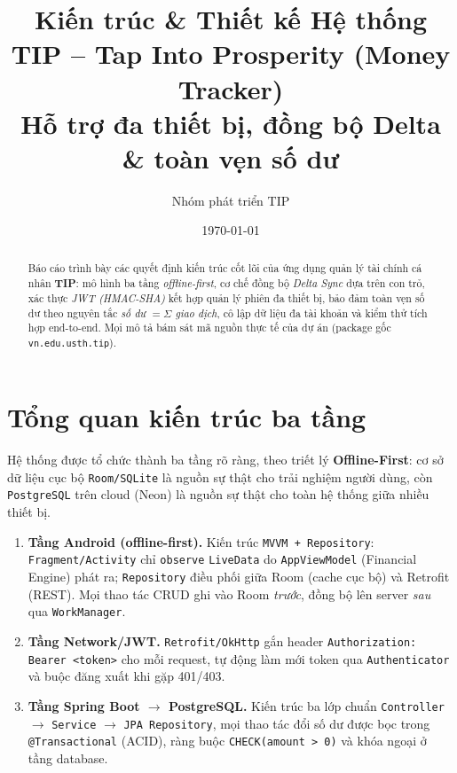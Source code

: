 \documentclass[11pt,a4paper]{article}
\title{\textbf{Kiến trúc \& Thiết kế Hệ thống}\\[4pt]
       \large TIP -- Tap Into Prosperity (Money Tracker)\\
       \normalsize Hỗ trợ đa thiết bị, đồng bộ Delta \& toàn vẹn số dư}
\author{Nhóm phát triển TIP}
\date{\today}
\begin{document}
\maketitle
\begin{abstract}
\noindent Báo cáo trình bày các quyết định kiến trúc cốt lõi của ứng dụng quản lý
tài chính cá nhân \textbf{TIP}: mô hình ba tầng \emph{offline-first}, cơ chế đồng bộ
\emph{Delta Sync} dựa trên con trỏ, xác thực \emph{JWT (HMAC-SHA)} kết hợp quản lý
phiên đa thiết bị, bảo đảm toàn vẹn số dư theo nguyên tắc \emph{số dư $=\Sigma$ giao dịch},
cô lập dữ liệu đa tài khoản và kiểm thử tích hợp end-to-end. Mọi mô tả bám sát mã nguồn
thực tế của dự án (package gốc \texttt{vn.edu.usth.tip}).
\end{abstract}

\tableofcontents
\newpage

\section{Tổng quan kiến trúc ba tầng}
\label{sec:overview}

Hệ thống được tổ chức thành ba tầng rõ ràng, theo triết lý \textbf{Offline-First}:
cơ sở dữ liệu cục bộ \texttt{Room/SQLite} là nguồn sự thật cho trải nghiệm người dùng,
còn \texttt{PostgreSQL} trên cloud (Neon) là nguồn sự thật cho toàn hệ thống giữa nhiều
thiết bị.

\begin{enumerate}[leftmargin=2em]
  \item \textbf{Tầng Android (offline-first).} Kiến trúc \texttt{MVVM + Repository}:
        \texttt{Fragment/Activity} chỉ \texttt{observe} \texttt{LiveData} do \texttt{AppViewModel}
        (Financial Engine) phát ra; \texttt{Repository} điều phối giữa Room (cache cục bộ)
        và Retrofit (REST). Mọi thao tác CRUD ghi vào Room \emph{trước}, đồng bộ lên server
        \emph{sau} qua \texttt{WorkManager}.
  \item \textbf{Tầng Network/JWT.} \texttt{Retrofit/OkHttp} gắn header
        \texttt{Authorization: Bearer <token>} cho mỗi request, tự động làm mới token qua
        \texttt{Authenticator} và buộc đăng xuất khi gặp 401/403.
  \item \textbf{Tầng Spring Boot $\rightarrow$ PostgreSQL.} Kiến trúc ba lớp chuẩn
        \texttt{Controller} $\rightarrow$ \texttt{Service} $\rightarrow$ \texttt{JPA Repository},
        mọi thao tác đổi số dư được bọc trong \texttt{@Transactional} (ACID), ràng buộc
        \texttt{CHECK(amount > 0)} và khóa ngoại ở tầng database.
\end{enumerate}
\end{document}
